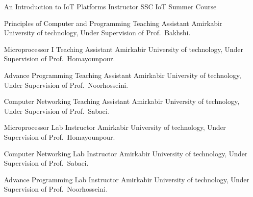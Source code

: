 \documentclass[]{friggeri-cv} %
\begin{document}
\begin{entrylist}

	{An Introduction to IoT Platforms}
	{Instructor}
	{SSC IoT Summer Course}


	{Principles of Computer and Programming}
	{Teaching Assistant}
	{Amirkabir University of technology, Under Supervision of Prof.\ Bakhshi.}

	
	{Microprocessor I}
	{Teaching Assistant}
	{Amirkabir University of technology, Under Supervision of Prof.\ Homayounpour.}
	

	{Advance Programming}
	{Teaching Assistant}
	{Amirkabir University of technology, Under Supervision of Prof.\ Noorhosseini.}
	

	{Computer Networking}
	{Teaching Assistant}
	{Amirkabir University of technology, Under Supervision of Prof.\ Sabaei.}
	

	{Microprocessor Lab}
	{Instructor}
	{Amirkabir University of technology, Under Supervision of Prof.\ Homayounpour.}


	{Computer Networking Lab}
	{Instructor}
	{Amirkabir University of technology, Under Supervision of Prof.\ Sabaei.}


	{Advance Programming Lab}
	{Instructor}
	{Amirkabir University of technology, Under Supervision of Prof.\ Noorhosseini.}
	


\end{entrylist}

\end{document}
